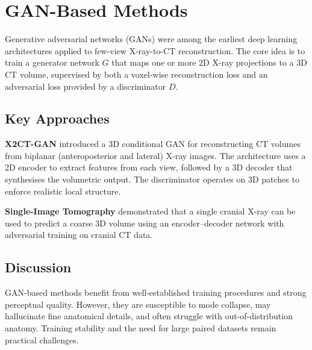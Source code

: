 
\section{GAN-Based Methods}
\label{sec:gan_methods}

Generative adversarial networks (GANs) were among the earliest deep learning architectures applied to few-view X-ray-to-CT reconstruction. The core idea is to train a generator network $G$ that maps one or more 2D X-ray projections to a 3D CT volume, supervised by both a voxel-wise reconstruction loss and an adversarial loss provided by a discriminator $D$.

\subsection{Key Approaches}

\textbf{X2CT-GAN} \cite{ying2019x2ct} introduced a 3D conditional GAN for reconstructing CT volumes from biplanar (anteroposterior and lateral) X-ray images. The architecture uses a 2D encoder to extract features from each view, followed by a 3D decoder that synthesises the volumetric output. The discriminator operates on 3D patches to enforce realistic local structure.

\textbf{Single-Image Tomography} \cite{henzler2018escaping} demonstrated that a single cranial X-ray can be used to predict a coarse 3D volume using an encoder--decoder network with adversarial training on cranial CT data.


\subsection{Discussion}

GAN-based methods benefit from well-established training procedures and strong perceptual quality. However, they are susceptible to mode collapse, may hallucinate fine anatomical details, and often struggle with out-of-distribution anatomy. Training stability and the need for large paired datasets remain practical challenges.

